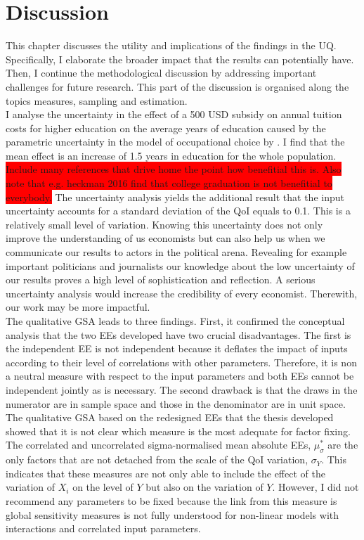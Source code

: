 \section{Discussion}
\thispagestyle{plain}  %

This chapter discusses the utility and implications of the findings in the UQ. Specifically, I elaborate the broader impact that the results can potentially have. Then, I continue the methodological discussion by addressing important challenges for future research. This part of the discussion is organised along the topics measures, sampling and estimation.\\

\noindent
I analyse the uncertainty in  the effect of a 500 USD subsidy on annual tuition costs for higher education on the average years of education caused by the parametric uncertainty in the model of occupational choice by \cite{Keane.1994}. I find that the mean effect is an increase of 1.5 years in education for the whole population. \colorbox{red}{Include many references that drive home the point how benefitial this is. Also note that e.g. heckman 2016 find that college graduation is not benefitial to everybody.}
The uncertainty analysis yields the additional result that the input uncertainty accounts for a standard deviation of the QoI equals to 0.1. This is a relatively small level of variation. Knowing this uncertainty does not only improve the understanding of us economists but can also help us when we communicate our results to actors in the political arena. Revealing for example important politicians and journalists our knowledge about the low uncertainty of our results proves a high level of sophistication and reflection. A serious uncertainty analysis would increase the credibility of every economist. Therewith, our work may be more impactful.\\

\noindent
The qualitative GSA leads to three findings.
First, it confirmed the conceptual analysis that the two EEs developed have \cite{ge2017extending} two crucial disadvantages. The first is the independent EE is not independent because it deflates the impact of inputs according to their level of correlations with other parameters. Therefore, it is non a neutral measure with respect to the input parameters and both EEs cannot be independent jointly as is necessary. The second drawback is that the draws in the numerator are in sample space and those in the denominator are in unit space. The qualitative GSA based on the redesigned EEs that the thesis developed showed that it is not clear which measure is the most adequate for factor fixing. The correlated and uncorrelated sigma-normalised mean absolute EEs, $\mu_\sigma^*$ are the only factors that are not detached from the scale of the QoI variation, $\sigma_Y$. This indicates that these measures are not only able to include the effect of the variation of $X_i$ on the level of $Y$ but also on the variation of $Y$. However, I did not recommend any parameters to be fixed because the link from this measure is global sensitivity measures is not fully understood for non-linear models with interactions and correlated input parameters.\\


